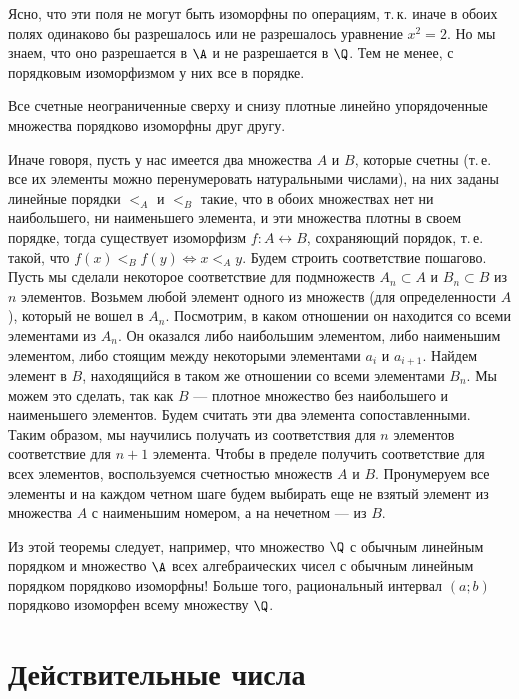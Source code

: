 \begin{enumerate}
Ясно, что эти поля не могут быть изоморфны по операциям, т.\,к. иначе в обоих полях одинаково бы разрешалось или не разрешалось уравнение $x^2=2$. Но мы знаем, что оно разрешается в $\A$ и не разрешается в $\Q$. Тем не менее, с порядковым изоморфизмом у них все в порядке.
\begin{thrm} Все счетные неограниченные сверху и снизу плотные линейно упорядоченные множества порядково изоморфны друг другу.\end{thrm}
Иначе говоря, пусть у нас имеется два множества $A$ и $B$, которые счетны (т.\,е. все их элементы можно перенумеровать натуральными числами), на них заданы линейные порядки $<_A$ и $<_B$ такие, что в обоих множествах нет ни наибольшего, ни наименьшего элемента, и эти множества плотны в своем порядке, тогда существует изоморфизм $f:A\leftrightarrow B$, сохраняющий порядок, т.\,е. такой, что $f(x)<_Bf(y)\Leftrightarrow x<_Ay$.
\pf
Будем строить соответствие пошагово. Пусть мы сделали некоторое соответствие для подмножеств $A_n\subset A$ и $B_n\subset B$ из $n$ элементов. Возьмем любой элемент одного из множеств (для определенности $A$), который не вошел в $A_n$. Посмотрим, в каком отношении он находится со всеми элементами из $A_n$. Он оказался либо наибольшим элементом, либо наименьшим элементом, либо стоящим между некоторыми элементами $a_i$ и $a_{i+1}$. Найдем элемент в $B$, находящийся в таком же отношении со всеми элементами $B_n$. Мы можем это сделать, так как $B$ --- плотное множество без наибольшего и наименьшего элементов. Будем считать эти два элемента сопоставленными. Таким образом, мы научились получать из соответствия для $n$ элементов соответствие для $n+1$ элемента. Чтобы в пределе получить соответствие для всех элементов, воспользуемся счетностью множеств $A$ и $B$. Пронумеруем все элементы и на каждом четном шаге будем выбирать еще не взятый элемент из множества $A$ с наименьшим номером, а на нечетном --- из $B$.
\epf

Из этой теоремы следует, например, что множество $\Q$ с обычным линейным порядком и множество $\A$ всех алгебраических чисел с обычным линейным порядком порядково изоморфны! Больше того, рациональный интервал $(a;b)$ порядково изоморфен всему множеству  $\Q$.
\end{enumerate}



\section{Действительные числа}

